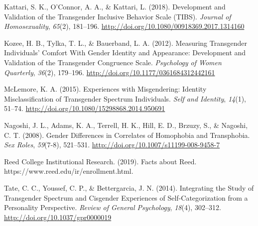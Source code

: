 \documentclass[12pt,twoside]{reedthesis}
\newlength{\cslhangindent}
\newenvironment{cslreferences}%
  {\setlength{\parindent}{0pt}%
  \everypar{\setlength{\hangindent}{\cslhangindent}}\ignorespaces}%
  {\par}
\begin{document}

\noindent

\setlength{\parindent}{-0.20in}
\setlength{\leftskip}{0.20in}
\setlength{\parskip}{8pt}

\hypertarget{refs}{}
\begin{cslreferences}
\leavevmode\hypertarget{ref-kattariDevelopmentValidationTransgender2018}{}%
Kattari, S. K., O'Connor, A. A., \& Kattari, L. (2018). Development and Validation of the Transgender Inclusive Behavior Scale (TIBS). \emph{Journal of Homosexuality}, \emph{65}(2), 181--196. \url{http://doi.org/10.1080/00918369.2017.1314160}

\leavevmode\hypertarget{ref-kozeeMeasuringTransgenderIndividuals2012}{}%
Kozee, H. B., Tylka, T. L., \& Bauerband, L. A. (2012). Measuring Transgender Individuals' Comfort With Gender Identity and Appearance: Development and Validation of the Transgender Congruence Scale. \emph{Psychology of Women Quarterly}, \emph{36}(2), 179--196. \url{http://doi.org/10.1177/0361684312442161}

\leavevmode\hypertarget{ref-mclemoreExperiencesMisgenderingIdentity2015}{}%
McLemore, K. A. (2015). Experiences with Misgendering: Identity Misclassification of Transgender Spectrum Individuals. \emph{Self and Identity}, \emph{14}(1), 51--74. \url{http://doi.org/10.1080/15298868.2014.950691}

\leavevmode\hypertarget{ref-nagoshiGenderDifferencesCorrelates2008}{}%
Nagoshi, J. L., Adams, K. A., Terrell, H. K., Hill, E. D., Brzuzy, S., \& Nagoshi, C. T. (2008). Gender Differences in Correlates of Homophobia and Transphobia. \emph{Sex Roles}, \emph{59}(7-8), 521--531. \url{http://doi.org/10.1007/s11199-008-9458-7}

\leavevmode\hypertarget{ref-reedcollegeinstitutionalresearchFactsReed2019}{}%
Reed College Institutional Research. (2019). Facts about Reed. https://www.reed.edu/ir/enrollment.html.

\leavevmode\hypertarget{ref-tateIntegratingStudyTransgender2014}{}%
Tate, C. C., Youssef, C. P., \& Bettergarcia, J. N. (2014). Integrating the Study of Transgender Spectrum and Cisgender Experiences of Self-Categorization from a Personality Perspective. \emph{Review of General Psychology}, \emph{18}(4), 302--312. \url{http://doi.org/10.1037/gpr0000019}
\end{cslreferences}

\end{document}

